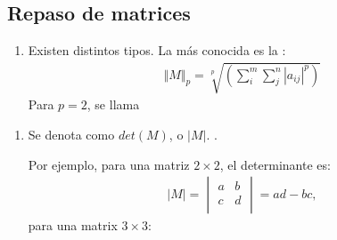 \documentclass[letterpaper,10pt,english]{jupyterBook}
\begin{document}
\subsection{Repaso de matrices}
\label{\detokenize{1.2-Algebra_lineal/1.2-Algebra_lineal:repaso-de-matrices}}\begin{enumerate}
%
\item {} 
\sphinxAtStartPar
{} Existen distintos tipos. La más conocida es la :
\begin{equation*}
\begin{split}\Vert M \Vert_{p} = \sqrt[p]{(\sum_i^m \sum_j^n |a_{ij}|^p)}\end{split}
\end{equation*}
\sphinxAtStartPar
Para \(p = 2\), se llama 

\end{enumerate}
\begin{enumerate}
%
\item {} 
\sphinxAtStartPar
{} Se denota como \(det(M)\), o \(|M|\). .

\sphinxAtStartPar
Por ejemplo, para una matriz \(2\times2\), el determinante es:
\begin{equation*}
\begin{split} |M| = \begin{vmatrix} a & b \\ 
                             c & d\\ 
            \end{vmatrix} = ad - bc,\end{split}
\end{equation*}
\sphinxAtStartPar
para una matrix \(3\times3\):

\end{enumerate}
\end{document}
